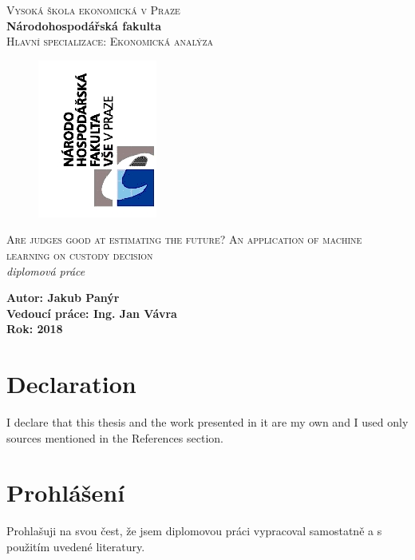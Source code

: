 \documentclass[12pt, twoside]{book} %
\begin{document}
\begin{titlepage}   %
\centering
\begin{center}
\textsc{ Vysoká škola ekonomická v Praze}\\[20pt]
\textbf{Národohospodářská fakulta}\\[20pt]
\textsc{Hlavní specializace: Ekonomická analýza}\\[14pt]

\begin{figure}[h]
  \centering
  \includegraphics{obr1_nf_logo}
\end{figure}

\textsc{Are judges good at estimating the future? An application of machine learning on custody decision}\\[24pt]
\textit{diplomová práce}\\[19pt]
\vspace*{\fill}

\begin{flushleft}
\textbf{Autor: Jakub Panýr}\\[17pt] 
\textbf{Vedoucí práce:  Ing. Jan Vávra}\\[17pt]  
\textbf{Rok: 2018}\\[17pt] 
\end{flushleft}

\end{center}
\end{titlepage}

\pagestyle{empty}     %
\clearpage\mbox{}\clearpage


\section*{Declaration}      %
\noindent
I declare that this thesis and the work presented in it are my own and I used only sources mentioned in the References section.

\section*{Prohlášení}
\noindent 
Prohlašuji na svou čest, že jsem diplomovou práci vypracoval samostatně a s použitím 
uvedené literatury.
\end{document}
